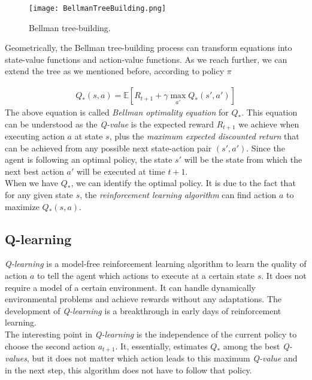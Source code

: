 \documentclass{article}
\begin{document}
\newpage 

\begin{figure}[h!]
\centering
\texttt{[image: BellmanTreeBuilding.png]}
\caption{Bellman tree-building.}
\end{figure}

Geometrically, the Bellman tree-building process can transform equations into state-value functions and action-value functions. As we reach further, we can extend the tree as we mentioned before, according to policy $\pi$

\begin{align}
    Q_{*}(s, a) = \mathbb{E}[R_{t+1} + \gamma \underset{a'}{\max}Q_{*}(s', a') \nonumber]
\end{align}
The above equation is called \textit{Bellman optimality equation} for $Q_{*}$. This equation can be understood as the \textit{Q-value} is the expected reward $R_{t+1}$ we achieve when executing action $a$ at state $s$, plus the \textit{maximum expected discounted return} that can be achieved from any possible next state-action pair $(s', a')$. Since the agent is following an optimal policy, the state $s'$ will be the state from which the next best action $a'$ will be executed at time $t+1$.\\
When we have $Q_{*}$, we can identify the optimal policy. It is due to the fact that for any given state $s$, the \textit{reinforcement learning algorithm} can find action $a$ to maximize $Q_{*}(s, a)$.

\subsection{Q-learning}
\textit{Q-learning} is a model-free reinforcement learning algorithm to learn the quality of action $a$ to tell the agent which actions to execute at a certain state $s$. It does not require a model of a certain environment. It can handle dynamically environmental problems and achieve rewards without any adaptations. The development of \textit{Q-learning} is a breakthrough in early days of reinforcement learning.\\



The interesting point in \textit{Q-learning} is the independence of the current policy to choose the second action $a_{t+1}$. It, essentially, estimates $Q_{*}$ among the best \textit{Q-values}, but it does not matter which action leads to this maximum \textit{Q-value} and in the next step, this algorithm does not have to follow that policy.
\end{document}
